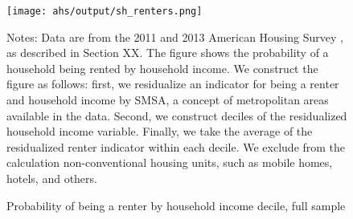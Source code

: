\begin{figure}[h!]
    \centering
    \caption{Probability of being a renter by household income decile,
             full sample}
    \label{fig:ahs_pr_renters}

    \texttt{[image: ahs/output/sh\_renters.png]}

    \begin{minipage}{.95\textwidth} \footnotesize
        \vspace{3mm}
        Notes: Data are from the 2011 and 2013 American Housing
        Survey \parencite{ahs2020}, as described in 
        Section XX. 
        The figure shows the probability of a household being
        rented by household income. 
        We construct the figure as follows: first, we residualize an
        indicator for being a renter and household income by SMSA,
        a concept of metropolitan areas available in the data.
        Second, we construct deciles of the residualized household
        income variable.
        Finally, we take the average of the residualized renter 
        indicator within each decile.
        We exclude from the calculation non-conventional housing units, 
        such as mobile homes, hotels, and others.
    \end{minipage}
\end{figure}
